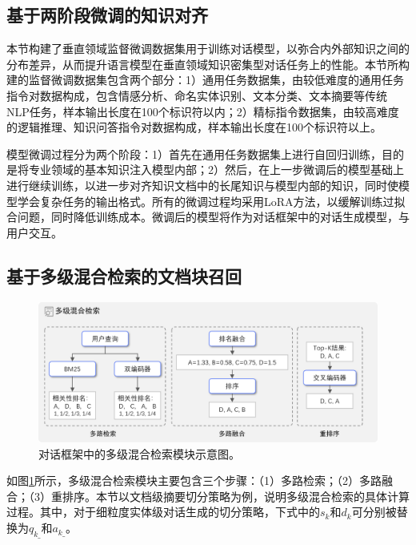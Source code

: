 \subsection{基于两阶段微调的知识对齐}

本节构建了垂直领域监督微调数据集用于训练对话模型，以弥合内外部知识之间的分布差异，从而提升语言模型在垂直领域知识密集型对话任务上的性能。本节所构建的监督微调数据集包含两个部分：1）通用任务数据集，由较低难度的通用任务指令对数据构成，包含情感分析、命名实体识别、文本分类、文本摘要等传统NLP任务，样本输出长度在100个标识符以内；2）精标指令数据集，由较高难度的逻辑推理、知识问答指令对数据构成，样本输出长度在100个标识符以上。

模型微调过程分为两个阶段：1）首先在通用任务数据集上进行自回归训练，目的是将专业领域的基本知识注入模型内部；2）然后，在上一步微调后的模型基础上进行继续训练，以进一步对齐知识文档中的长尾知识与模型内部的知识，同时使模型学会复杂任务的输出格式。所有的微调过程均采用LoRA方法，以缓解训练过拟合问题，同时降低训练成本。微调后的模型将作为对话框架中的对话生成模型，与用户交互。

\subsection{基于多级混合检索的文档块召回}

\begin{figure}[htbp]
	\centering
	\includegraphics[scale=0.55]{Fig/search_module.png}
	\caption{\label{search_module}对话框架中的多级混合检索模块示意图。}
\end{figure}

如图\ref{search_module}所示，多级混合检索模块主要包含三个步骤：（1）多路检索；（2）多路融合；（3）重排序。本节以文档级摘要切分策略为例，说明多级混合检索的具体计算过程。其中，对于细粒度实体级对话生成的切分策略，下式中的$s_k$和$d_k$可分别被替换为$q_{k\_}$和$a_{k\_}$。

